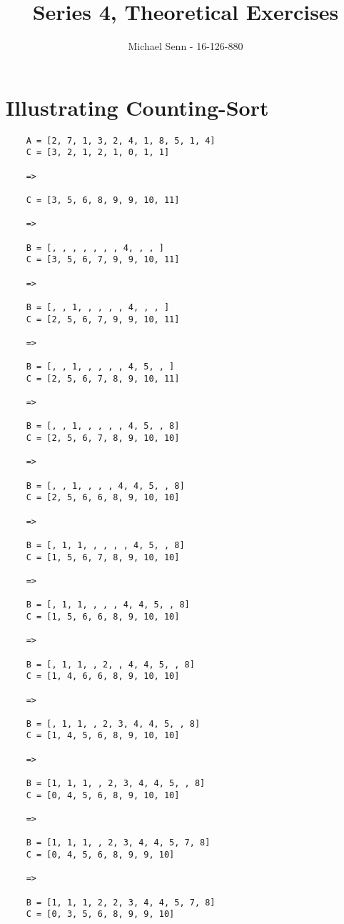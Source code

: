 \documentclass[a4paper]{scrartcl}
\title{Series 4, Theoretical Exercises}
\author{Michael Senn - 16-126-880}
\date{}
\begin{document}
\maketitle


\section{Illustrating Counting-Sort}

\begin{verbatim}
	A = [2, 7, 1, 3, 2, 4, 1, 8, 5, 1, 4]
	C = [3, 2, 1, 2, 1, 0, 1, 1]

	=>

	C = [3, 5, 6, 8, 9, 9, 10, 11]

	=>

	B = [, , , , , , , 4, , , ]
	C = [3, 5, 6, 7, 9, 9, 10, 11]

	=>

	B = [, , 1, , , , , 4, , , ]
	C = [2, 5, 6, 7, 9, 9, 10, 11]

	=>

	B = [, , 1, , , , , 4, 5, , ]
	C = [2, 5, 6, 7, 8, 9, 10, 11]

	=>

	B = [, , 1, , , , , 4, 5, , 8]
	C = [2, 5, 6, 7, 8, 9, 10, 10]

	=>

	B = [, , 1, , , , 4, 4, 5, , 8]
	C = [2, 5, 6, 6, 8, 9, 10, 10]

	=>

	B = [, 1, 1, , , , , 4, 5, , 8]
	C = [1, 5, 6, 7, 8, 9, 10, 10]

	=>

	B = [, 1, 1, , , , 4, 4, 5, , 8]
	C = [1, 5, 6, 6, 8, 9, 10, 10]

	=>

	B = [, 1, 1, , 2, , 4, 4, 5, , 8]
	C = [1, 4, 6, 6, 8, 9, 10, 10]

	=>

	B = [, 1, 1, , 2, 3, 4, 4, 5, , 8]
	C = [1, 4, 5, 6, 8, 9, 10, 10]

	=>

	B = [1, 1, 1, , 2, 3, 4, 4, 5, , 8]
	C = [0, 4, 5, 6, 8, 9, 10, 10]

	=>

	B = [1, 1, 1, , 2, 3, 4, 4, 5, 7, 8]
	C = [0, 4, 5, 6, 8, 9, 9, 10]

	=>

	B = [1, 1, 1, 2, 2, 3, 4, 4, 5, 7, 8]
	C = [0, 3, 5, 6, 8, 9, 9, 10]
\end{verbatim}
\end{document}
